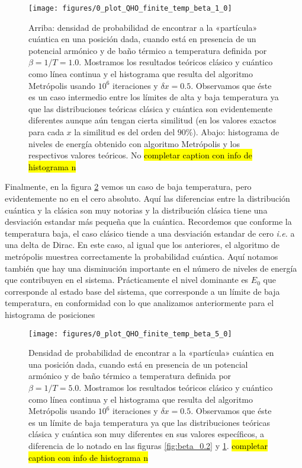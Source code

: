 \documentclass[%
 reprint,
 amsmath,amssymb,
 aps,
 pra,
]{revtex4-2}
\begin{document}
\begin{figure}[!b]
	\centering
	\texttt{[image: figures/0\_plot\_QHO\_finite\_temp\_beta\_1\_0]}
	\caption{Arriba: densidad de probabilidad de encontrar a la «partícula» cuántica en una posición dada, cuando está en presencia de un potencial armónico y de baño térmico a temperatura definida por $\beta=1/T=1.0$. Mostramos los resultados teóricos clásico y cuántico como línea continua y el histograma que resulta del algoritmo Metrópolis usando $10^6$ iteraciones y $\delta x = 0.5$. Observamos que éste es un caso intermedio entre los límites de alta y baja temperatura ya que las distribuciones teóricas clásica y cuántica son evidentemente diferentes aunque aún tengan cierta similitud (en los valores exactos para cada $x$ la similitud es del orden del $90\%$). Abajo: histograma de niveles de energía obtenido con algoritmo Metrópolis y los respectivos valores teóricos. No \hl{completar caption con info de histograma n}}
	\label{fig:beta_1.0}
\end{figure}

Finalmente, en la figura \ref{fig:beta_5.0} vemos un caso de baja temperatura, pero evidentemente no en el cero absoluto. Aquí las diferencias entre la distribución cuántica y la clásica son muy notorias y la distribución clásica tiene una desviación estandar más pequeña que la cuántica. Recordemos que conforme la temperatura baja, el caso clásico tiende a una desviación estandar de cero \textit{i.e.} a una delta de Dirac. En este caso, al igual que los anteriores, el algoritmo de metrópolis muestrea correctamente la probabilidad cuántica. Aquí notamos también que hay una disminución importante en el número de niveles de energía que contribuyen en el sistema. Prácticamente el nivel dominante es $E_0$ que corresponde al estado base del sistema, que corresponde a un límite de baja temperatura, en conformidad con lo que analizamos anteriormente para el histograma de posiciones

\begin{figure}[t]
	\centering
	\texttt{[image: figures/0\_plot\_QHO\_finite\_temp\_beta\_5\_0]}
	\caption{Densidad de probabilidad de encontrar a la «partícula» cuántica en una posición dada, cuando está en presencia de un potencial armónico y de baño térmico a temperatura definida por $\beta=1/T=5.0$. Mostramos los resultados teóricos clásico y cuántico como línea continua y el histograma que resulta del algoritmo Metrópolis usando $10^6$ iteraciones y $\delta x = 0.5$. Observamos que éste es un límite de baja temperatura ya que las distribuciones teóricas clásica y cuántica son muy diferentes en sus valores específicos, a diferencia de lo notado en las figuras \ref{fig:beta_0.2} y \ref{fig:beta_1.0}. \hl{completar caption con info de histograma n}}
	\label{fig:beta_5.0}
\end{figure}
\end{document}
